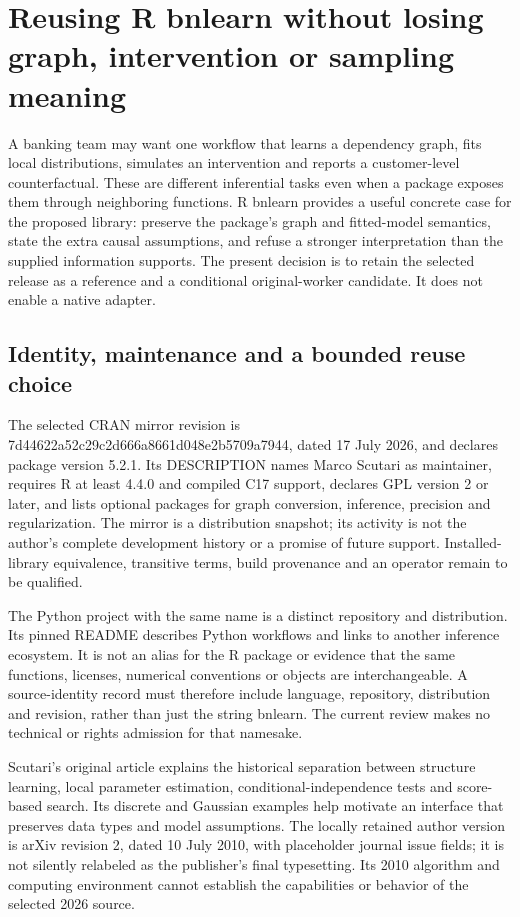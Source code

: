 \section{Reusing R bnlearn without losing graph, intervention or sampling meaning}
\label{sec:exec24-bnlearn-reuse}
A banking team may want one workflow that learns a dependency graph, fits local distributions, simulates an intervention and reports a customer-level counterfactual. These are different inferential tasks even when a package exposes them through neighboring functions. R bnlearn provides a useful concrete case for the proposed library: preserve the package's graph and fitted-model semantics, state the extra causal assumptions, and refuse a stronger interpretation than the supplied information supports. The present decision is to retain the selected release as a reference and a conditional original-worker candidate. It does not enable a native adapter.~\citep{exec24_bnlearn_sources,exec24_bnlearn_contract}

\subsection{Identity, maintenance and a bounded reuse choice}
The selected CRAN mirror revision is 7d44622a52c29c2d666a8661d048e2b5709a7944, dated 17 July 2026, and declares package version 5.2.1. Its DESCRIPTION names Marco Scutari as maintainer, requires R at least 4.4.0 and compiled C17 support, declares GPL version 2 or later, and lists optional packages for graph conversion, inference, precision and regularization. The mirror is a distribution snapshot; its activity is not the author's complete development history or a promise of future support. Installed-library equivalence, transitive terms, build provenance and an operator remain to be qualified.~\citep{exec24_bnlearn_sources}

The Python project with the same name is a distinct repository and distribution. Its pinned README describes Python workflows and links to another inference ecosystem. It is not an alias for the R package or evidence that the same functions, licenses, numerical conventions or objects are interchangeable. A source-identity record must therefore include language, repository, distribution and revision, rather than just the string bnlearn. The current review makes no technical or rights admission for that namesake.~\citep{exec24_bnlearn_identity,exec24_bnlearn_contract}

Scutari's original article explains the historical separation between structure learning, local parameter estimation, conditional-independence tests and score-based search. Its discrete and Gaussian examples help motivate an interface that preserves data types and model assumptions. The locally retained author version is arXiv revision 2, dated 10 July 2010, with placeholder journal issue fields; it is not silently relabeled as the publisher's final typesetting. Its 2010 algorithm and computing environment cannot establish the capabilities or behavior of the selected 2026 source.~\citep{exec24_bnlearn_original}

